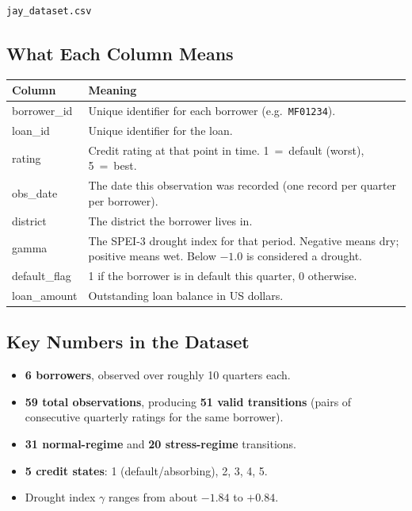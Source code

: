 \documentclass[12pt,a4paper]{article}
\begin{document}
\begin{lstlisting}[language=bash, numbers=none]
jay_dataset.csv
\end{lstlisting}

\subsection{What Each Column Means}

\begin{center}
\begin{tabular}{>{\ttfamily}lp{9.5cm}}
  \toprule
  Column & Meaning \\
  \midrule
  borrower\_id   & Unique identifier for each borrower (e.g.\ \texttt{MF01234}). \\
  loan\_id       & Unique identifier for the loan. \\
  rating         & Credit rating at that point in time.
                   1~=~default (worst), 5~=~best. \\
  obs\_date      & The date this observation was recorded
                   (one record per quarter per borrower). \\
  district       & The district the borrower lives in. \\
  gamma          & The SPEI-3 drought index for that period.
                   Negative means dry; positive means wet.
                   Below $-1.0$ is considered a drought. \\
  default\_flag  & 1 if the borrower is in default this quarter, 0 otherwise. \\
  loan\_amount   & Outstanding loan balance in US dollars. \\
  \bottomrule
\end{tabular}
\end{center}

\subsection{Key Numbers in the Dataset}

\begin{itemize}[leftmargin=1.5em]
  \item \textbf{6 borrowers}, observed over roughly 10 quarters each.
  \item \textbf{59 total observations}, producing \textbf{51 valid transitions}
        (pairs of consecutive quarterly ratings for the same borrower).
  \item \textbf{31 normal-regime} and \textbf{20 stress-regime} transitions.
  \item \textbf{5 credit states}: 1 (default/absorbing), 2, 3, 4, 5.
  \item Drought index $\gamma$ ranges from about $-1.84$ to $+0.84$.
\end{itemize}
\end{document}
